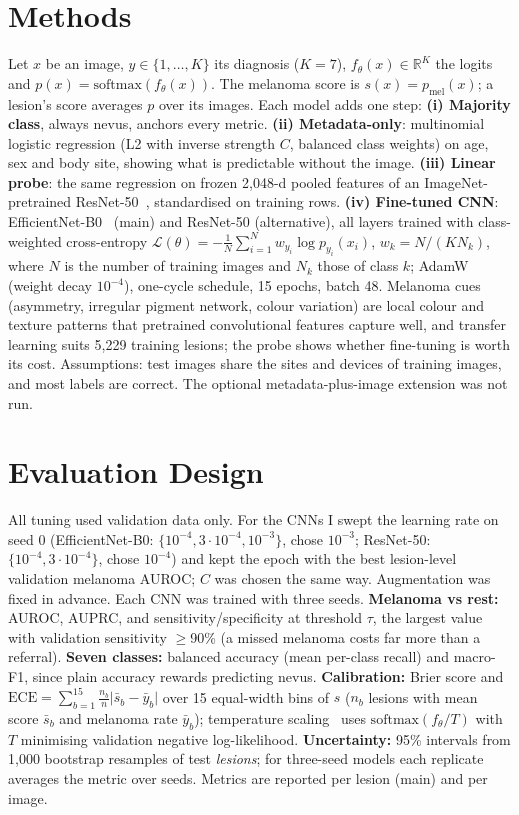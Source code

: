 \documentclass{article}
\begin{document}
\section{Methods}
Let $x$ be an image, $y\in\{1,\dots,K\}$ its diagnosis ($K{=}7$), $f_\theta(x)\in\mathbb{R}^K$ the
logits and $p(x)=\mathrm{softmax}(f_\theta(x))$. The melanoma score is $s(x)=p_{\text{mel}}(x)$; a
lesion's score averages $p$ over its images. Each model adds one step:
\textbf{(i) Majority class}, always nevus, anchors every metric.
\textbf{(ii) Metadata-only}: multinomial logistic regression (L2 with inverse strength $C$, balanced
class weights) on age, sex and body site, showing what is predictable without the image.
\textbf{(iii) Linear probe}: the same regression on frozen 2{,}048-d pooled features of an
ImageNet-pretrained ResNet-50~\citep{he2016}, standardised on training rows.
\textbf{(iv) Fine-tuned CNN}: EfficientNet-B0~\citep{tan2019} (main) and ResNet-50 (alternative), all
layers trained with class-weighted cross-entropy
$\mathcal{L}(\theta)=-\frac{1}{N}\sum_{i=1}^{N} w_{y_i}\log p_{y_i}(x_i)$, $w_k=N/(K N_k)$, where $N$ is
the number of training images and $N_k$ those of class $k$; AdamW (weight decay $10^{-4}$), one-cycle
schedule, 15 epochs, batch 48. Melanoma cues (asymmetry, irregular pigment network, colour variation)
are local colour and texture patterns that pretrained convolutional features capture well, and
transfer learning suits 5{,}229 training lesions; the probe shows whether fine-tuning is worth its
cost. Assumptions: test images share the sites and devices of training images, and most labels are
correct. The optional metadata-plus-image extension was not run.

\section{Evaluation Design}
All tuning used validation data only. For the CNNs I swept the learning rate on seed 0
(EfficientNet-B0: $\{10^{-4}, 3{\cdot}10^{-4}, 10^{-3}\}$, chose $10^{-3}$; ResNet-50:
$\{10^{-4}, 3{\cdot}10^{-4}\}$, chose $10^{-4}$) and kept the epoch with the best lesion-level validation
melanoma AUROC; $C$ was chosen the same way. Augmentation was fixed in advance. Each CNN was trained
with three seeds.
\textbf{Melanoma vs rest:} AUROC, AUPRC, and sensitivity/specificity at threshold $\tau$, the largest
value with validation sensitivity $\geq$90\% (a missed melanoma costs far more than a referral). \textbf{Seven classes:} balanced accuracy (mean per-class recall) and macro-F1, since plain
accuracy rewards predicting nevus. \textbf{Calibration:} Brier score and
$\mathrm{ECE}=\sum_{b=1}^{15}\frac{n_b}{n}\lvert\bar{s}_b-\bar{y}_b\rvert$ over 15 equal-width bins of
$s$ ($n_b$ lesions with mean score $\bar{s}_b$ and melanoma rate $\bar{y}_b$); temperature
scaling~\citep{guo2017} uses $\mathrm{softmax}(f_\theta/T)$ with $T$ minimising validation negative
log-likelihood. \textbf{Uncertainty:} 95\% intervals from 1{,}000 bootstrap resamples of test
\emph{lesions}; for three-seed models each replicate averages the metric over seeds. Metrics are
reported per lesion (main) and per image.
\end{document}
